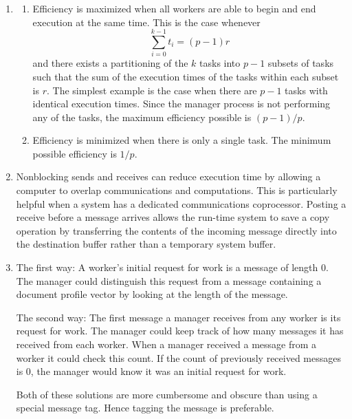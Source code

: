 \begin{enumerate}

\item \begin{enumerate}
      \item Efficiency is maximized when all workers are able to begin and
            end execution at the same time. This is the case whenever
            $$\sum_{i=0}^{k-1}t_i = (p-1)r$$
            and there exists a partitioning of the $k$ tasks into $p-1$ subsets
            of tasks such that the sum of the execution times of the tasks
            within each subset is $r$. The simplest example is the case when
            there are $p-1$ tasks with identical execution times.
            Since the manager process is not performing any of the tasks,
            the maximum efficiency possible is $(p-1)/p$.
      \item Efficiency is minimized when there is only a single task. The
            minimum possible efficiency is $1/p$.
      \end{enumerate}

\item Nonblocking sends and receives can reduce execution time by
      allowing a computer to overlap communications and computations.
      This is particularly helpful when a system has a dedicated communications
      coprocessor.
      Posting a receive before a message arrives allows the run-time
      system to save a copy operation by transferring the contents
      of the incoming message directly into the destination buffer rather
      than a temporary system buffer.

\item The first way:
      A worker's initial request for work is a message of length 0.
      The manager could distinguish this request from a message containing
      a document profile vector by looking at the length of the message.
      
      The second way:
      The first message a manager receives from any worker is its request for
      work. The manager could keep track of how many messages it has received
      from each worker. When a manager received a message from a worker it
      could check this count. If the count of previously received messages is 
      0, the manager would know it was an initial request for work.

      Both of these solutions are more cumbersome and obscure than using
      a special message tag. Hence tagging the message is preferable.


\end{enumerate}
